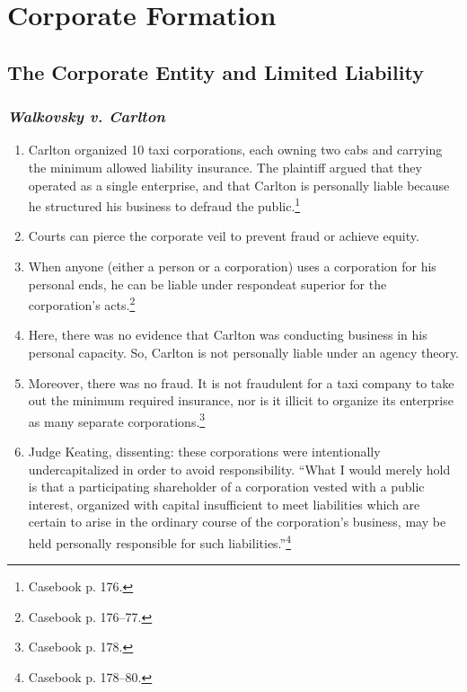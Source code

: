 \section{Corporate Formation}

\subsection{The Corporate Entity and Limited Liability}

\subsubsection{\emph{Walkovsky v. Carlton}}

\begin{enumerate}
    \item Carlton organized 10 taxi corporations, each owning two cabs and 
    carrying the minimum allowed liability insurance. The plaintiff argued 
    that they operated as a single enterprise, and that Carlton is personally 
    liable because he structured his business to defraud the 
    public.\footnote{Casebook p. 176.}
    \item Courts can pierce the corporate veil to prevent fraud or achieve 
    equity.
    \item When anyone (either a person or a corporation) uses a corporation 
    for his personal ends, he can be liable under respondeat superior for the 
    corporation's acts.\footnote{Casebook p. 176--77.}
    \item Here, there was no evidence that Carlton was conducting business in 
    his personal capacity. So, Carlton is not personally liable under an 
    agency theory.
    \item Moreover, there was no fraud. It is not fraudulent for a taxi 
    company to take out the minimum required insurance, nor is it illicit to 
    organize its enterprise as many separate corporations.\footnote{Casebook 
    p. 178.}
    \item Judge Keating, dissenting: these corporations were intentionally 
    undercapitalized in order to avoid responsibility. ``What I would merely 
    hold is that a participating shareholder of a corporation vested with a 
    public interest, organized with capital insufficient to meet liabilities 
    which are certain to arise in the ordinary course of the corporation's 
    business, may be held personally responsible for such 
    liabilities.''\footnote{Casebook p. 178--80.}
\end{enumerate}

